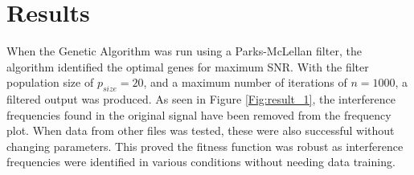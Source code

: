 \documentclass[a4paper, 11pt]{article}
\begin{document}
\section{Results}\label{sec:res}
    When the Genetic Algorithm was run using a Parks-McLellan filter, the algorithm identified the optimal genes for maximum SNR. 
    With the filter population size of $p_{size} = 20$, and a maximum number of iterations of $n = 1000$, a filtered 
    output was produced. As seen in Figure \ref{Fig:result_1}, the interference frequencies found in the original signal have 
    been removed from the frequency plot. When data from other files was tested, these were also successful without changing 
    parameters. This proved the fitness function was robust as interference frequencies were identified in various conditions
    without needing data training. 
    
\end{document}
